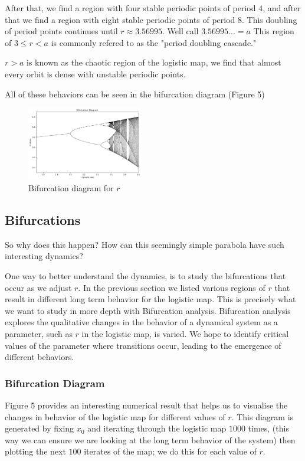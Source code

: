 \documentclass[11pt,twocolumn]{article}
\begin{document}
After that, we find a region with four stable periodic points of period $4$, and after that we find a region with eight stable periodic points of period $8$.
This doubling of period points continues until $r\approx 3.56995$. Well call $3.56995...= a$ 
This region of $3\leq r<a$ is commonly refered to as the "period doubling cascade."

$r>a$ is known as the chaotic region of the logistic map, we find that almost every orbit is dense with unstable periodic points.

All of these behaviors can be seen in the bifurcation diagram (Figure 5)
\begin{figure}
    \centering
\includegraphics[width=0.45\textwidth]{figures/bifurcations.png}
    \caption{Bifurcation diagram for $r$}
    \label{fig:enter-label}
\end{figure}
\subsection{Bifurcations}
So why does this happen? How can this seemingly simple parabola have such interesting dynamics?

One way to better understand the dynamics, is to study the bifurcations that occur as we adjust $r$. In the previous section we listed various regions of $r$ that result in different long term behavior for the logistic map.
This is precisely what we want to study in more depth with Bifurcation analysis.
Bifurcation analysis explores the qualitative changes in the behavior of a dynamical system as a parameter, such as $r$ in the logistic map, is varied. We hope to identify critical values of the parameter where transitions occur, leading to the emergence of different behaviors.
\subsubsection{Bifurcation Diagram}
Figure 5 provides an interesting numerical result that helps us to visualise the changes in behavior of the logistic map for different values of $r$.
This diagram is generated by fixing $x_0$ and iterating through the logistic map $1000$ times, (this way we can ensure we are looking at the long term behavior of the system) then plotting the next $100$ iterates of the map; we do this for each value of $r$.
\end{document}
